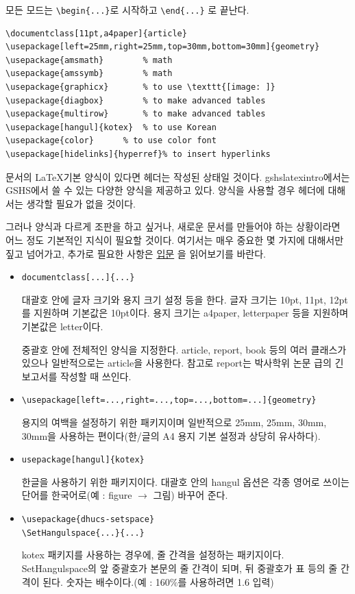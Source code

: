 \documentclass[11pt]{article}
\newcommand{\lshort}{%
	\href{http://texdoc.net/texmf-dist/doc/latex/%
		lshort-korean/lshort-kr.pdf%
	}{\LaTeXe 입문}%
}
\begin{document}
모든 모드는 \verb|\begin{...}|로 시작하고 \verb|\end{...}| 로 끝난다.

\begin{verbatim}
\documentclass[11pt,a4paper]{article}
\usepackage[left=25mm,right=25mm,top=30mm,bottom=30mm]{geometry}
\usepackage{amsmath}		% math
\usepackage{amssymb}		% math
\usepackage{graphicx}		% to use \texttt{[image: ]}
\usepackage{diagbox}		% to make advanced tables 
\usepackage{multirow}		% to make advanced tables 
\usepackage[hangul]{kotex}	% to use Korean
\usepackage{color} 		% to use color font 
\usepackage[hidelinks]{hyperref}% to insert hyperlinks
\end{verbatim}

문서의 \LaTeX\enspace 기본 양식이 있다면 헤더는 작성된 상태일 것이다. 
gshslatexintro에서는 GSHS에서 쓸 수 있는 다양한 양식을 제공하고 있다. 양식을 
사용할 경우 헤더에 대해서는 생각할 필요가 없을 것이다.

그러나 양식과 다르게 조판을 하고 싶거나, 새로운 문서를 만들어야 하는 
상황이라면 어느 정도 기본적인 지식이 필요할 것이다. 여기서는 매우 중요한 몇 
가지에 대해서만 짚고 넘어가고, 추가로 필요한 사항은 \lshort 을 읽어보기를 
바란다.

\begin{itemize}
	\item \verb|documentclass[...]{...}|
	
	대괄호 안에 글자 크기와 용지 크기 설정 등을 한다. 글자 크기는
	10pt, 11pt, 12pt를 지원하며 기본값은 10pt이다. 용지 크기는 a4paper, 
	letterpaper 등을 지원하며 기본값은 letter이다.
	
	중괄호 안에 전체적인 양식을 지정한다. article, report, book 등의 여러 
	클래스가 있으나 일반적으로는 article을 사용한다. 참고로 report는 
	박사학위 논문 급의 긴 보고서를 작성할 때 쓰인다.
	
	\item 
	\verb|\usepackage[left=...,right=...,top=...,bottom=...]{geometry}|
	
	용지의 여백을 설정하기 위한 패키지이며 일반적으로 25mm, 25mm, 30mm, 
	30mm을 사용하는 편이다(한/글의 A4 용지 기본 설정과 상당히 유사하다).
	
	\item \verb|usepackage[hangul]{kotex}|
	
	한글을 사용하기 위한 패키지이다. 대괄호 안의 hangul 옵션은 각종 영어로 
	쓰이는 단어를 한국어로(예 : figure $\rightarrow$ 그림) 바꾸어 준다.
	
	\item \verb|\usepackage{dhucs-setspace}|\\
	\verb|\SetHangulspace{...}{...}|
	
	kotex 패키지를 사용하는 경우에, 줄 간격을 설정하는 패키지이다.
	SetHangulspace의 앞 중괄호가 본문의 줄 간격이 되며, 뒤 중괄호가 표 등의 
	줄 간격이 된다. 숫자는 배수이다.(예 : 160\%를 사용하려면 1.6 입력)
\end{itemize}
\end{document}
